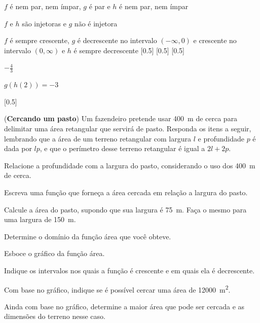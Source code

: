 \begin{exercises*}
\begin{exercise}
  \begin{answer}
    \begin{alphalist}
      \item $f$ é nem par, nem ímpar, $g$ é par e $h$ é nem par, nem ímpar
      \item $f$ e $h$ são injetoras e $g$ não é injetora
      \item $f$ é sempre crescente, $g$ é decrescente no intervalo $(-\infty, 0)$
            e crescente no intervalo $(0, \infty)$ e $h$ é sempre decrescente
            [0.5]
            [0.5]
            [0.5]
      \item $-\frac{4}{3}$
      \item $g(h(2))=-3$
      \item {}[0.5]
    \end{alphalist}
  \end{answer}
\end{exercise}

\begin{exercise}
  (\textbf{Cercando um pasto}) Um fazendeiro pretende usar \SI{400}{\meter}
  de cerca para delimitar uma área retangular que servirá de pasto.
  Responda os itens a seguir, lembrando que a área de um terreno retangular
  com largura $l$ e profundidade $p$ é dada por $lp$,
  e que o perímetro desse terreno retangular é igual a $2l+2p$.
  \begin{alphalist}
    \item Relacione a profundidade com a largura do pasto, considerando o uso
          dos \SI{400}{\meter} de cerca.
    \item Escreva uma função que forneça a área cercada em relação a largura
          do pasto.
    \item Calcule a área do pasto, supondo que sua largura é \SI{75}{\meter}.
          Faça o mesmo para uma largura de \SI{150}{\meter}.
    \item Determine o domínio da função área que você obteve.
    \item Esboce o gráfico da função área.
    \item Indique os intervalos nos quais a função é crescente e em quais
          ela é decrescente.
    \item Com base no gráfico, indique se é possível cercar uma área de
          \SI{12000}{\meter^2}.
    \item Ainda com base no gráfico, determine a maior área que pode ser
          cercada e as dimensões do terreno nesse caso.
  \end{alphalist}


\end{exercise}
\end{exercises*}
